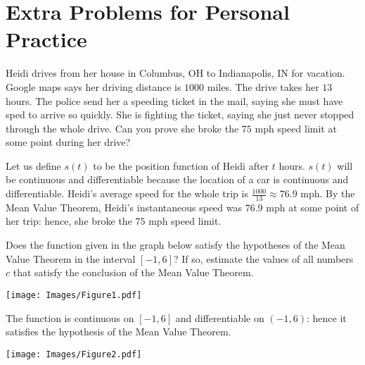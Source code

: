 \documentclass[nooutcomes]{ximera}
\renewenvironment{freeResponse}{
\ifhandout\setbox0\vbox\bgroup\else
\begin{trivlist}\item[\hskip \labelsep\bfseries Solution:\hspace{2ex}]
\fi}
{\ifhandout\egroup\else
\end{trivlist}
\fi}
\begin{document}
\section{Extra Problems for Personal Practice}
\begin{problem}
  Heidi drives from her house in Columbus, OH to Indianapolis, IN for vacation.
  Google maps says her driving distance is $1000$ miles.
  The drive takes her $13$ hours.
  The police send her a speeding ticket in the mail, saying she must have sped to arrive so quickly.
  She is fighting the ticket, saying she just never stopped through the whole drive.
  Can you prove she broke the $75$ mph speed limit at some point during her drive?
  \begin{freeResponse}
    Let us define $s(t)$ to be the position function of Heidi after $t$ hours.
    $s(t)$ will be continuous and differentiable because the location of a car is continuous and differentiable.
    Heidi’s average speed for the whole trip is $\frac{1000}{13}\approx 76.9$ mph.
    By the Mean Value Theorem, Heidi’s instantaneous speed was $76.9$ mph at some point of her trip: hence, she broke the $75$ mph speed limit.
  \end{freeResponse}
\end{problem}

\begin{problem}
  Does the function given in the graph below satisfy the hypotheses of the Mean Value Theorem in the interval $[-1,6]$?
  If so, estimate the values of all numbers $c$ that satisfy the conclusion of the Mean Value Theorem.  
  \begin{image}
    \texttt{[image: Images/Figure1.pdf]}
  \end{image}
  \begin{freeResponse}
    The function is continuous on $[-1,6]$ and differentiable on $(-1,6)$: hence it satisfies the hypothesis of the Mean Value Theorem.
    \begin{image}
      \texttt{[image: Images/Figure2.pdf]}
    \end{image}
  \end{freeResponse}
\end{problem}
\end{document}
